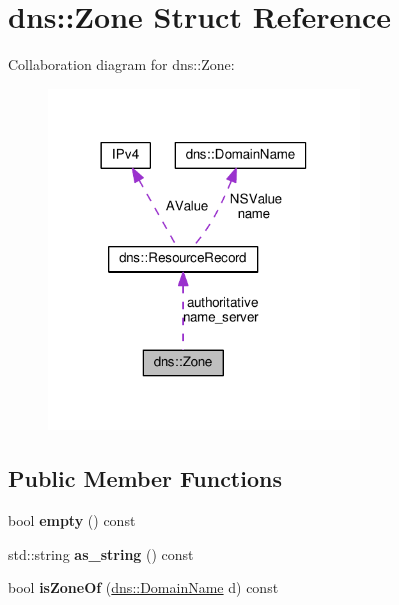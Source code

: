 \hypertarget{structdns_1_1Zone}{}\section{dns\+:\+:Zone Struct Reference}
\label{structdns_1_1Zone}


Collaboration diagram for dns\+:\+:Zone\+:\nopagebreak
\begin{figure}[H]
\begin{center}
\leavevmode
\includegraphics[width=234pt]{structdns_1_1Zone__coll__graph}
\end{center}
\end{figure}
\subsection*{Public Member Functions}
\begin{DoxyCompactItemize}
\item 
bool {\bfseries empty} () const \hypertarget{structdns_1_1Zone_ad33a2d40f6301c559907d66f1c86d64e}{}\label{structdns_1_1Zone_ad33a2d40f6301c559907d66f1c86d64e}

\item 
std\+::string {\bfseries as\+\_\+string} () const \hypertarget{structdns_1_1Zone_a424d36efa5adc9e4f4b7e6073ade3763}{}\label{structdns_1_1Zone_a424d36efa5adc9e4f4b7e6073ade3763}

\item 
bool {\bfseries is\+Zone\+Of} (\hyperlink{structdns_1_1DomainName}{dns\+::\+Domain\+Name} d) const \hypertarget{structdns_1_1Zone_adbd4dcf69ed0f8ce57831b9231220463}{}\label{structdns_1_1Zone_adbd4dcf69ed0f8ce57831b9231220463}

\end{DoxyCompactItemize}

